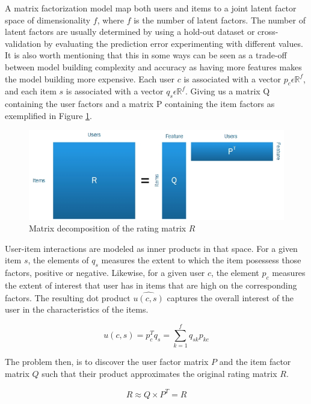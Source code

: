 A matrix factorization model map both users and items to a joint latent factor space of dimensionality $f$, where $f$ is the number of latent factors. The number of latent factors are usually determined by using a hold-out dataset or cross-validation by evaluating the prediction error experimenting with different values. It is also worth mentioning that this in some ways can be seen as a trade-off between model building complexity and accuracy as having more features makes the model building more expensive. Each user $c$ is associated with a vector $p_{c} \epsilon \mathbb{R}^{f}$, and each item $s$ is associated with a vector $q_{s} \epsilon \mathbb{R}^{f}$. Giving us a matrix Q containing the user factors and a matrix P containing the item factors as exemplified in Figure \ref{figure:matrixdecomp}.

\begin{figure}[H]
    \includegraphics[width=5in]{image/matrixdecomp.jpg}
    \centering
    \caption[Matrix decomposition of the rating matrix $R$]{Matrix decomposition of the rating matrix $R$}
    \label{figure:matrixdecomp}
\end{figure}

User-item interactions are modeled as inner products in that space. For a given item $s$, the elements of $q_{s}$ measures the extent to which the item posessess those factors, positive or negative. Likewise, for a given user $c$, the element $p_{c}$ measures the extent of interest that user has in items that are high on the corresponding factors. The resulting dot product $\hat{u(c,s)}$ captures the overall interest of the user in the characteristics of the items.

\begin{equation}
u(c,s) = p_{c}^{T}q_{s} = \sum_{k=1}^{f} q_{sk}p_{kc}
\end{equation}

The problem then, is to discover the user factor matrix $P$ and the item factor matrix $Q$ such that their product approximates the original rating matrix $R$.

\begin{equation}
R \approx Q \times P^{T} = \hat{R}
\end{equation}

